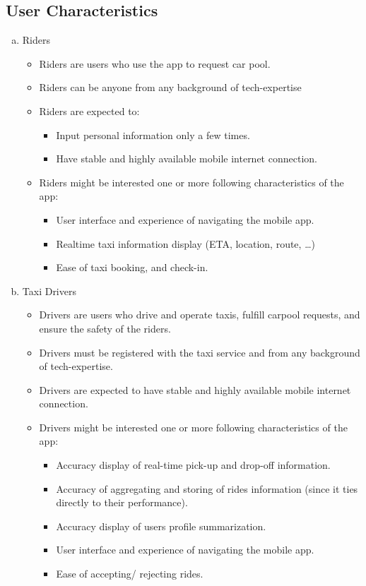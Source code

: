 \documentclass[]{article}
\begin{document}
\subsection{User Characteristics}
\label{sub:user_characteristics}

\begin{enumerate}[a)]
	\item Riders
	\begin{itemize}
		\item Riders are users who use the app to request car pool.
		\item Riders can be anyone from any background of tech-expertise
		\item Riders are expected to:
		\begin{itemize}
			\item Input personal information only a few times.
			\item Have stable and highly available mobile internet connection.
		\end{itemize}
		
		\item Riders might be interested one or more following characteristics of the app:
		\begin{itemize}
			\item User interface and experience of navigating the mobile app.
			\item Realtime taxi information display (ETA, location, route, …)
			\item Ease of taxi booking, and check-in.  
		\end{itemize}
	\end{itemize}
	
	\item Taxi Drivers
	\begin{itemize}
		\item Drivers are users who drive and operate taxis, fulfill carpool requests, and ensure the safety of the riders.
		\item Drivers must be registered with the taxi service and from any background of tech-expertise.  
		\item Drivers are expected to have stable and highly available mobile internet connection.
		\item Drivers might be interested one or more following characteristics of the app:
		\begin{itemize}
			\item Accuracy display of real-time pick-up and drop-off information.
			\item Accuracy of aggregating and storing of rides information (since it ties directly to their performance).
			\item Accuracy display of user\textquotesingle s profile summarization.
			\item User interface and experience of navigating the mobile app.
			\item Ease of accepting/ rejecting rides.
		\end{itemize}

	\end{itemize}

\end{enumerate}
\end{document}
